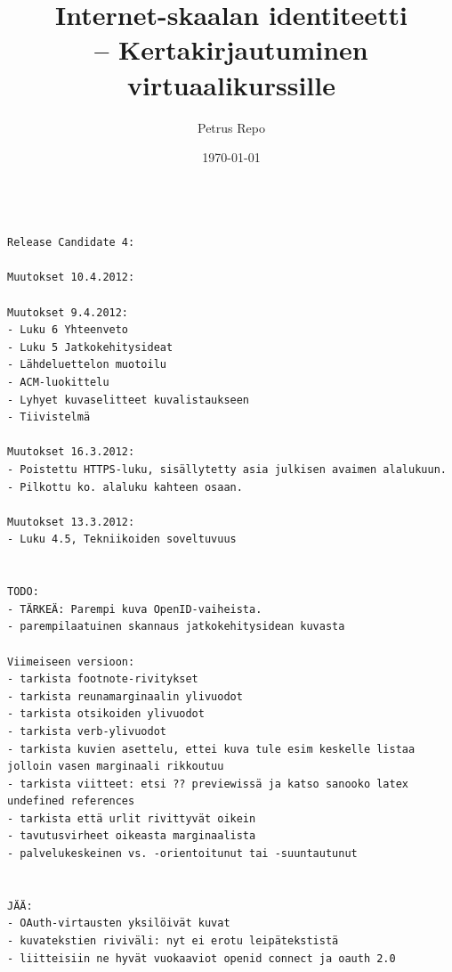 \documentclass[finnish,gradu]{tktltiki}
\begin{document}
\begin{singlespacing}
\begin{verbatim}

Release Candidate 4:

Muutokset 10.4.2012:

Muutokset 9.4.2012:
- Luku 6 Yhteenveto
- Luku 5 Jatkokehitysideat
- Lähdeluettelon muotoilu
- ACM-luokittelu
- Lyhyet kuvaselitteet kuvalistaukseen
- Tiivistelmä

Muutokset 16.3.2012:
- Poistettu HTTPS-luku, sisällytetty asia julkisen avaimen alalukuun.
- Pilkottu ko. alaluku kahteen osaan.

Muutokset 13.3.2012:
- Luku 4.5, Tekniikoiden soveltuvuus


TODO:
- TÄRKEÄ: Parempi kuva OpenID-vaiheista.
- parempilaatuinen skannaus jatkokehitysidean kuvasta

Viimeiseen versioon:
- tarkista footnote-rivitykset
- tarkista reunamarginaalin ylivuodot
- tarkista otsikoiden ylivuodot
- tarkista verb-ylivuodot
- tarkista kuvien asettelu, ettei kuva tule esim keskelle listaa jolloin vasen marginaali rikkoutuu
- tarkista viitteet: etsi ?? previewissä ja katso sanooko latex undefined references
- tarkista että urlit rivittyvät oikein
- tavutusvirheet oikeasta marginaalista
- palvelukeskeinen vs. -orientoitunut tai -suuntautunut


JÄÄ:
- OAuth-virtausten yksilöivät kuvat
- kuvatekstien riviväli: nyt ei erotu leipätekstistä
- liitteisiin ne hyvät vuokaaviot openid connect ja oauth 2.0


\end{verbatim}
\end{singlespacing}


\title{Internet-skaalan identiteetti
    \\ -- Kertakirjautuminen virtuaalikurssille}

\author{Petrus Repo}
\date{\today}
\maketitle

\onehalfspacing

\subject{Tietojenkäsittelytiede}

\end{document}
